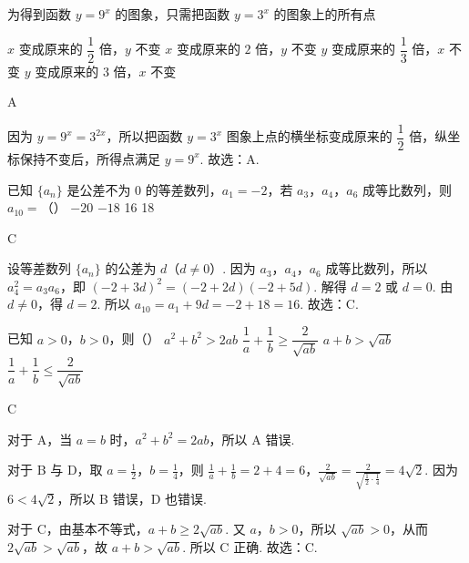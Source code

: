 \documentclass[UTF8,a4paper,oneside,11pt]{ctexbook}
\begin{document}
\begin{problem}
为得到函数 \(y=9^x\) 的图象，只需把函数 \(y=3^x\) 的图象上的所有点

\choices
    {\(x\) 变成原来的 \(\dfrac12\) 倍，\(y\) 不变}
    {\(x\) 变成原来的 \(2\) 倍，\(y\) 不变}
    {\(y\) 变成原来的 \(\dfrac13\) 倍，\(x\) 不变}
    {\(y\) 变成原来的 \(3\) 倍，\(x\) 不变}
\end{problem}

\begin{answer}
A
\end{answer}

\begin{solution}
因为 \(y=9^x=3^{2x}\)，所以把函数 \(y=3^x\) 图象上点的横坐标变成原来的 \(\dfrac12\) 倍，纵坐标保持不变后，所得点满足 \(y=9^x\). 故选：A.
\end{solution}

\begin{problem}
已知 \(\{a_n\}\) 是公差不为 0 的等差数列，\(a_1=-2\)，若 \(a_3\)，\(a_4\)，\(a_6\) 成等比数列，则 \(a_{10}=\)（\quad）
\choices
    {\(-20\)}
    {\(-18\)}
    {16}
    {18}
\end{problem}

\begin{answer}
C
\end{answer}

\begin{solution}
设等差数列 \(\{a_n\}\) 的公差为 \(d\)（\(d\neq 0\)）. 因为 \(a_3\)，\(a_4\)，\(a_6\) 成等比数列，所以 \(a_4^2=a_3a_6\)，即 \((-2+3d)^2=(-2+2d)(-2+5d)\). 解得 \(d=2\) 或 \(d=0\). 由 \(d\neq 0\)，得 \(d=2\). 所以 \(a_{10}=a_1+9d=-2+18=16\). 故选：C.
\end{solution}

\begin{problem}
已知 \(a>0\)，\(b>0\)，则（\quad）
\choices
    {\(a^2+b^2>2ab\)}
    {\(\dfrac{1}{a}+\dfrac{1}{b}\ge \dfrac{2}{\sqrt{ab}}\)}
    {\(a+b>\sqrt{ab}\)}
    {\(\dfrac{1}{a}+\dfrac{1}{b}\le \dfrac{2}{\sqrt{ab}}\)}
\end{problem}

\begin{answer}
C
\end{answer}

\begin{solution}
对于 A，当 \(a=b\) 时，\(a^2+b^2=2ab\)，所以 A 错误.

对于 B 与 D，取 \(a=\frac12\)，\(b=\frac14\)，则 \(\frac{1}{a}+\frac{1}{b}=2+4=6\)，\(\frac{2}{\sqrt{ab}}=\frac{2}{\sqrt{\frac12\cdot\frac14}}=4\sqrt2\). 因为 \(6<4\sqrt2\)，所以 B 错误，D 也错误.

对于 C，由基本不等式，\(a+b\ge 2\sqrt{ab}\). 又 \(a\)，\(b>0\)，所以 \(\sqrt{ab}>0\)，从而 \(2\sqrt{ab}>\sqrt{ab}\)，故 \(a+b>\sqrt{ab}\).
所以 C 正确. 故选：C.
\end{solution}
\end{document}
